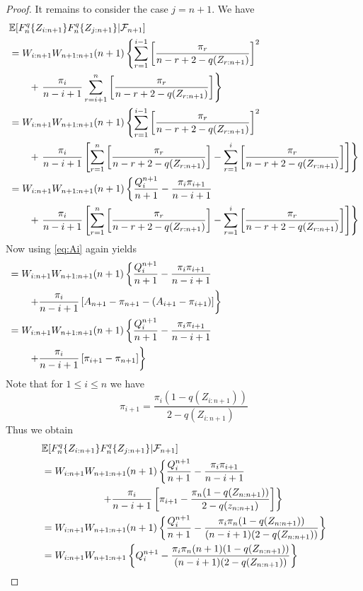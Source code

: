 \begin{proof}
%
It remains to consider the case $j=n+1$. We have
\begin{align*}
&  \mathbb{E}[F_n^q\{Z_{i:n+1}\}F_n^q\{Z_{j:n+1}\}|\mathcal{F}_{n+1}]\\
&= W_{i:n+1}W_{n+1:n+1}(n+1) \left\{\sum\limits_{r=1}^{i-1}\left[\frac{\pi_r}{n-r+2-q(Z_{r:n+1})} \right]^2\right.\\
& \qquad + \left. \frac{\pi_i}{n-i+1}\sum\limits_{r=i+1}^{n} \left[\frac{\pi_r}{n-r+2-q(Z_{r:n+1})}\right]\right\}\\
&= W_{i:n+1}W_{n+1:n+1}(n+1) \left\{\sum\limits_{r=1}^{i-1}\left[\frac{\pi_r}{n-r+2-q(Z_{r:n+1})} \right]^2\right.\\
& \qquad + \left. \frac{\pi_i}{n-i+1}\left[\sum\limits_{r=1}^{n} \left[\frac{\pi_r}{n-r+2-q(Z_{r:n+1})}\right] - \sum\limits_{r=1}^{i} \left[\frac{\pi_r}{n-r+2-q(Z_{r:n+1})}\right]\right]\right\}\\
&= W_{i:n+1}W_{n+1:n+1}(n+1) \left\{\frac{Q_i^{n+1}}{n+1} - \frac{\pi_i\pi_{i+1}}{n-i+1}\right.\\
& \qquad + \left. \frac{\pi_i}{n-i+1}\left[\sum\limits_{r=1}^{n} \left[\frac{\pi_r}{n-r+2-q(Z_{r:n+1})}\right] - \sum\limits_{r=1}^{i}  \left[\frac{\pi_r}{n-r+2-q(Z_{r:n+1})}\right]\right]\right\}
\end{align*}
Now using \eqref{eq:Ai} again yields
\begin{align*}
&= W_{i:n+1}W_{n+1:n+1}(n+1) \left\{\frac{Q_i^{n+1}}{n+1} - \frac{\pi_i\pi_{i+1}}{n-i+1}\right.\\
& \qquad \left. + \frac{\pi_i}{n-i+1}\left[A_{n+1} - \pi_{n+1} - (A_{i+1}-\pi_{i+1}) \right] \right\}\\
&= W_{i:n+1}W_{n+1:n+1}(n+1) \left\{\frac{Q_i^{n+1}}{n+1} - \frac{\pi_i\pi_{i+1}}{n-i+1}\right.\\
& \qquad \left. + \frac{\pi_i}{n-i+1}\left[  \pi_{i+1} - \pi_{n+1} \right] \right\}\hphantom{asdfasdfasfsadfasdfasdfasfsadfasdfasdfasfsa}
\end{align*}
Note that for $1\leq i\leq n$ we have
$$\pi_{i+1} = \frac{\pi_i (1-q(Z_{i:n+1}))}{2-q(Z_{i:n+1})}$$
Thus we obtain
\begin{align*}
&  \mathbb{E}[F_n^q\{Z_{i:n+1}\}F_n^q\{Z_{j:n+1}\}|\mathcal{F}_{n+1}]\\
&= W_{i:n+1}W_{n+1:n+1}(n+1) \left\{\frac{Q_i^{n+1}}{n+1} - \frac{\pi_i\pi_{i+1}}{n-i+1}\right.\\
& \qquad\qquad\qquad \left. + \frac{\pi_i}{n-i+1}\left[\pi_{i+1} - \frac{\pi_n(1-q(Z_{n:n+1}))}{2-q(z_{n:n+1})}   \right] \right\}\\
&= W_{i:n+1}W_{n+1:n+1}(n+1) \left\{\frac{Q_i^{n+1}}{n+1} - \frac{\pi_i\pi_n(1-q(Z_{n:n+1}))}{(n-i+1)(2-q(Z_{n:n+1}))} \right\}\\
&= W_{i:n+1}W_{n+1:n+1} \left\{Q_i^{n+1} - \frac{\pi_i\pi_n(n+1)(1-q(Z_{n:n+1}))}{(n-i+1)(2-q(Z_{n:n+1}))} \right\}
\end{align*}
\end{proof}
